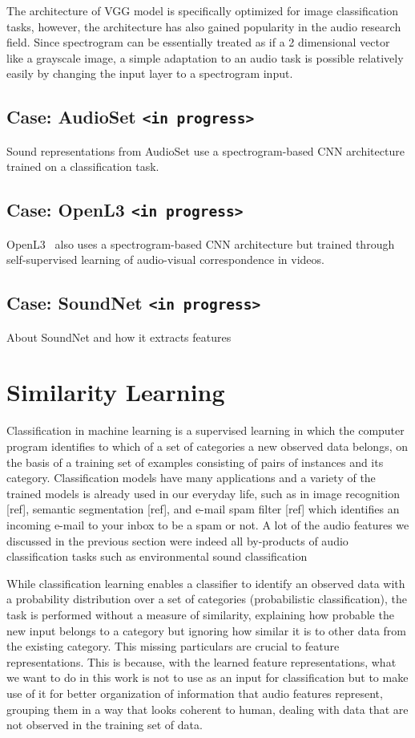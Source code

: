 The architecture of VGG model is specifically optimized for image classification tasks, however, the architecture has also gained popularity in the audio research field. Since spectrogram can be essentially treated as if a 2 dimensional vector like a grayscale image, a simple adaptation to an audio task is possible relatively easily by changing the input layer to a spectrogram input.

\subsection{Case: AudioSet \texttt{<in progress>}}
Sound representations  from AudioSet \cite{jort2017} use a spectrogram-based CNN architecture trained on a classification task.

\subsection{Case: OpenL3 \texttt{<in progress>}}
OpenL3~\cite{cramer2019} also uses a spectrogram-based CNN architecture but trained through self-supervised learning of audio-visual correspondence in videos.

\subsection{Case: SoundNet \texttt{<in progress>}}
About SoundNet and how it extracts features

\section{Similarity Learning}
Classification in machine learning is a supervised learning in which the computer program identifies to which of a set of categories a new observed data belongs, on the basis of a training set of examples consisting of pairs of instances and its category. Classification models have many applications and a variety of the trained models is already used in our everyday life, such as in image recognition [ref], semantic segmentation [ref], and e-mail spam filter [ref] which identifies an incoming e-mail to your inbox to be a spam or not. A lot of the audio features we discussed in the previous section were indeed all by-products of audio classification tasks such as environmental sound classification

While classification learning enables a classifier to identify an observed data with a probability distribution over a set of categories (probabilistic classification), the task is performed without a measure of similarity, explaining how probable the new input belongs to a category but ignoring how similar it is to other data from the existing category. This missing particulars are crucial to feature representations. This is because, with the learned feature representations, what we want to do in this work is not to use as an input for classification but to make use of it for better organization of information that audio features represent, grouping them in a way that looks coherent to human, dealing with data that are not observed in the training set of data.

